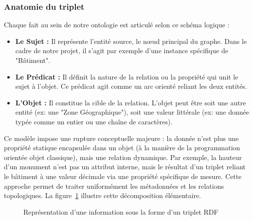 \documentclass{article}
\begin{document}
\subsubsection{Anatomie du triplet}
Chaque fait au sein de notre ontologie est articulé selon ce schéma logique :
\begin{itemize}
    \item \textbf{Le Sujet :} Il représente l'entité source, le nœud principal du graphe. Dans le cadre de notre projet, il s'agit par exemple d'une instance spécifique de "Bâtiment".
    \item \textbf{Le Prédicat :} Il définit la nature de la relation ou la propriété qui unit le sujet à l'objet. Ce prédicat agit comme un arc orienté reliant les deux entités.
    \item \textbf{L'Objet :} Il constitue la cible de la relation. L'objet peut être soit une autre entité (ex: une "Zone Géographique"), soit une valeur littérale (ex: une donnée typée comme un entier ou une chaîne de caractères).
\end{itemize}

Ce modèle impose une rupture conceptuelle majeure : la donnée n'est plus une propriété statique encapsulée dans un objet (à la manière de la programmation orientée objet classique), mais une relation dynamique. Par exemple, la hauteur d'un monument n'est pas un attribut interne, mais le résultat d'un triplet reliant le bâtiment à une valeur décimale via une propriété spécifique de mesure. Cette approche permet de traiter uniformément les métadonnées et les relations topologiques. La figure~\ref{fig:rdf-triplet} illustre cette décomposition élémentaire.

\begin{figure}[htbp]
    \centering
    \caption{Représentation d'une information sous la forme d'un triplet RDF}
    \label{fig:rdf-triplet}
\end{figure}
\end{document}
